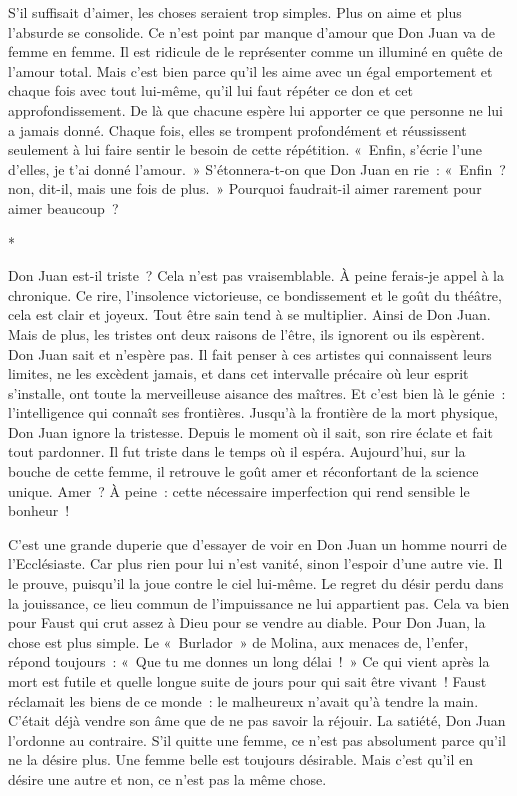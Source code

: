 \documentclass{book}
\begin{document}
S'il suffisait d'aimer, les choses seraient trop simples. Plus on aime et plus l'absurde se consolide. Ce n'est point par manque d'amour que Don Juan va de femme en femme. Il est ridicule de le représenter comme un illuminé en quête de l'amour total. Mais c'est bien parce qu'il les aime avec un égal emportement et chaque fois avec tout lui‑même, qu'il lui faut répéter ce don et cet approfondissement. De là que chacune espère lui apporter ce que personne ne lui a jamais donné. Chaque fois, elles se trompent profondément et réussissent seulement à lui faire sentir le besoin de cette répétition. « Enfin, s'écrie l'une d'elles, je t'ai donné l'amour. » S'étonnera-t-on que Don Juan en rie : « Enfin ? non, dit-il, mais une fois de plus. » Pourquoi faudrait-il aimer rarement pour aimer beaucoup ?

\begin{center}
*
\end{center}

Don Juan est-il triste ? Cela n'est pas vraisemblable. À peine ferais-je appel à la chronique. Ce rire, l'insolence victorieuse, ce bondissement et le goût du théâtre, cela est clair et joyeux. Tout être sain tend à se multiplier. Ainsi de Don Juan. Mais de plus, les tristes ont deux raisons de l'être, ils ignorent ou ils espèrent. Don Juan sait et n'espère pas. Il fait penser à ces artistes qui connaissent leurs limites, ne les excèdent jamais, et dans cet intervalle précaire où leur esprit s'installe, ont toute la merveilleuse aisance des maîtres. Et c'est bien là le génie : l'intelligence qui connaît ses frontières. Jusqu'à la frontière de la mort physique, Don Juan ignore la tristesse. Depuis le moment où il sait, son rire éclate et fait tout pardonner. Il fut triste dans le temps où il espéra. Aujourd'hui, sur la bouche de cette femme, il retrouve le goût amer et réconfortant de la science unique. Amer ? À peine : cette nécessaire imperfection qui rend sensible le bonheur !

C'est une grande duperie que d'essayer de voir en Don Juan un homme nourri de l'Ecclésiaste. Car plus rien pour lui n’est vanité, sinon l'espoir d'une autre vie. Il le prouve, puisqu'il la joue contre le ciel lui‑même. Le regret du désir perdu dans la jouissance, ce lieu commun de l'impuissance ne lui appartient pas. Cela va bien pour Faust qui crut assez à Dieu pour se vendre au diable. Pour Don Juan, la chose est plus simple. Le « Burlador » de Molina, aux menaces de, l'enfer, répond toujours : « Que tu me donnes un long délai ! » Ce qui vient après la mort est futile et quelle longue suite de jours pour qui sait être vivant ! Faust réclamait les biens de ce monde : le malheureux n'avait qu'à tendre la main. C'était déjà vendre son âme que de ne pas savoir la réjouir. La satiété, Don Juan l'ordonne au contraire. S'il quitte une femme, ce n'est pas absolument parce qu'il ne la désire plus. Une femme belle est toujours désirable. Mais c'est qu'il en désire une autre et non, ce n'est pas la même chose.
\end{document}
